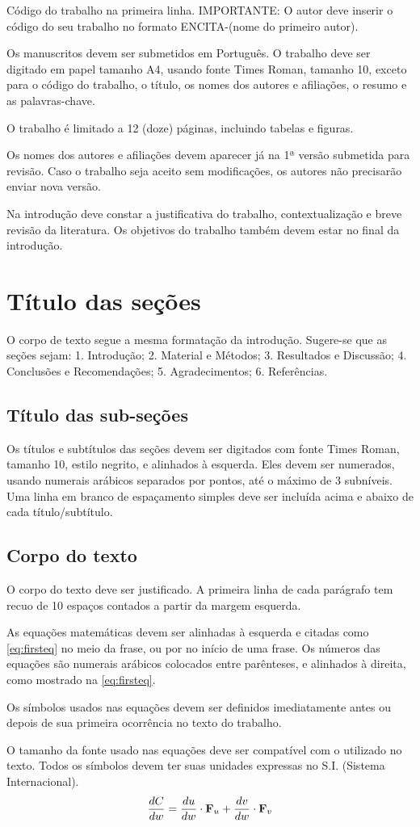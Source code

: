 \documentclass[brazilian, fleqn, 10pt]{article}
\renewcommand\sec[1]{%
    \medskip
    \section{#1}
    \medskip
}
\newcommand\ssec[1]{%
    \medskip
    \subsection{#1}
    \medskip
}
\newcommand\be[1]{%
    \medskip
    \begin{#1}
}
\newcommand\ee[1]{%
    \end{#1}

    \medskip
}
\begin{document}
Código do trabalho na primeira linha. IMPORTANTE: O autor deve inserir o código
do seu trabalho no formato ENCITA-(nome do primeiro autor).

Os manuscritos devem ser submetidos em Português. O trabalho deve ser digitado
em papel tamanho A4, usando fonte Times Roman, tamanho 10, exceto para o código
do trabalho, o título, os nomes dos autores e afiliações, o resumo e as palavras-chave. 

O trabalho é limitado a 12 (doze) páginas, incluindo tabelas e figuras.

Os nomes dos autores e afiliações devem aparecer já na 1ª versão submetida para
revisão. Caso o trabalho seja aceito sem modificações, os autores não precisarão
enviar nova versão.

Na introdução deve constar a justificativa do trabalho, contextualização e breve
revisão da literatura. Os objetivos do trabalho também devem estar no final da
introdução.

\sec{Título das seções}

O corpo de texto segue a mesma formatação da introdução. Sugere-se que as seções
sejam: 1. Introdução; 2. Material e Métodos; 3. Resultados e Discussão; 4.
Conclusões e Recomendações; 5. Agradecimentos; 6. Referências.

\ssec{Título das sub-seções}

Os títulos e subtítulos das seções devem ser digitados com fonte Times Roman,
tamanho 10, estilo negrito, e alinhados à esquerda. Eles devem ser numerados,
usando numerais arábicos separados por pontos, até o máximo de 3 subníveis. Uma
linha em branco de espaçamento simples deve ser incluída acima e abaixo de cada
título/subtítulo.

\ssec{Corpo do texto}

O corpo do texto deve ser justificado. A primeira linha de cada parágrafo tem
recuo de 10 espaços contados a partir da margem esquerda.

As equações matemáticas devem ser alinhadas à esquerda e citadas como \cref{eq:firsteq} no
meio da frase, ou por  no início de uma frase. Os números das
equações são numerais arábicos colocados entre parênteses, e alinhados à
direita, como mostrado na \cref{eq:firsteq}.

Os símbolos usados nas equações devem ser definidos imediatamente antes ou
depois de sua primeira ocorrência no texto do trabalho.

\newpage

O tamanho da fonte usado nas equações deve ser compatível com o utilizado no
texto. Todos os símbolos devem ter suas unidades expressas no S.I. (Sistema
Internacional).
\be{equation} \label{eq:firsteq}
    \frac{d C}{d w} = \frac{d u}{d w} \cdot \vb{F}_u + \frac{d v}{d w} \cdot \vb{F}_v
\ee{equation}
\end{document}
